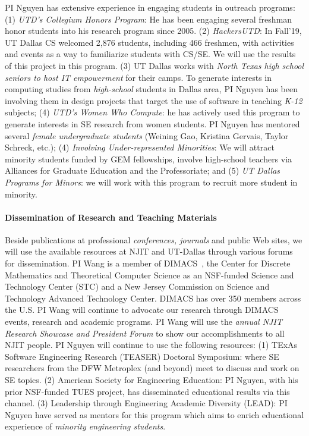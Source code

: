 PI Nguyen has extensive experience in engaging students in
outreach programs: (1) {\em UTD's Collegium Honors Program}: He
has been engaging several freshman honor students into his research
program since 2005. (2) {\em HackersUTD}: In Fall'19, UT Dallas CS
welcomed 2,876 students, including 466 freshmen, with activities and
events as a way to familiarize students with CS/SE. We will use the
results of this project in this program.
%
(3) UT Dallas works with {\em North Texas high school seniors to host
IT empowerment} for their camps. To generate interests in computing
studies from {\em high-school} students in Dallas area, PI Nguyen has
been involving them in design projects that target the use of software
in teaching {\em K-12} subjects; (4) {\em UTD's Women Who Compute}: he
has actively used this program to generate interests in SE research
from women students. PI Nguyen has mentored several {\em female
undergraduate students} (Weining Gao, Kristina Gervais, Taylor
Schreck, etc.); (4) {\em Involving Under-represented Minorities}: We
will attract minority students funded by GEM fellowships, involve
high-school teachers via Alliances for Graduate Education and the
Professoriate; and (5) {\em UT Dallas Programs for Minors}: we will
work with this program to recruit more student in minority.


\paragraph{Dissemination of Research and Teaching Materials}

Beside publications at professional \emph{conferences, journals} and
public Web sites, we will use the available resources at NJIT and
UT-Dallas through various forums for dissemination.
%
PI Wang is a member of DIMACS~\cite{dimacs}, the Center for Discrete
Mathematics and Theoretical Computer Science as an NSF-funded Science
and Technology Center (STC) and a New Jersey Commission on Science and
Technology Advanced Technology Center. DIMACS has over 350 members
across the U.S. PI Wang will continue to advocate our research through
DIMACS events, research and academic programs.  PI Wang will use
the \textit{annual NJIT Research Showcase and President Forum} to show
our accomplishments to all NJIT people.  PI Nguyen will continue to
use the following resources: (1) TExAs Software Engineering Research
(TEASER) Doctoral Symposium: where SE researchers from the DFW
Metroplex (and beyond) meet to discuss and work on SE topics.
%
(2) American Society for Engineering Education: PI Nguyen, with his
prior NSF-funded TUES project, has disseminated educational results
via this channel.
(3) Leadership through Engineering Academic Diversity (LEAD): PI
Nguyen have served as mentors for this program which aims to enrich
educational experience of {\em minority engineering students}.

